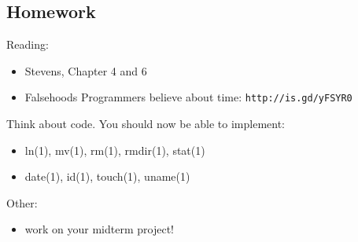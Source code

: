 \documentclass[xga]{xdvislides}
\begin{document}
\subsection{Homework}
Reading:
\begin{itemize}
	\item Stevens, Chapter 4 and 6
	\item Falsehoods Programmers believe about time: {\tt http://is.gd/yFSYR0}
\end{itemize}
\vspace{.25in}
Think about code.  You should now be able to
implement:
\begin{itemize}
	\item ln(1), mv(1), rm(1), rmdir(1), stat(1)
	\item date(1), id(1), touch(1), uname(1)
\end{itemize}
\vspace{.25in}
Other:
\begin{itemize}
	\item work on your midterm project!
\end{itemize}
\end{document}
